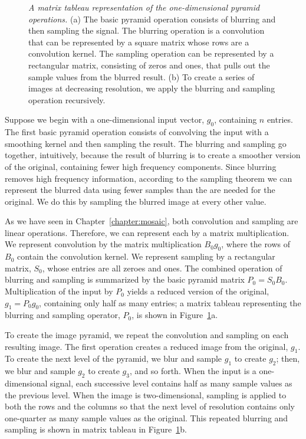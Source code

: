 \begin{figure}
\centerline{
}
\caption[Matrix tableau of one-dimensional pyramid]{
{\em A matrix tableau representation of the one-dimensional pyramid
operations. }  (a)  The basic pyramid operation consists of blurring
and then sampling the signal.  The blurring operation is a convolution
that can be represented by a square matrix whose rows are a
convolution kernel.  The sampling operation can be represented by a
rectangular matrix, consisting of zeros and ones, that pulls out the
sample values from the blurred result.  (b)  To create a series of
images at decreasing resolution, we apply the blurring and sampling
operation recursively.
}
\label{f7:pyramid1Tableau}
\end{figure}
Suppose we begin with a one-dimensional input vector, $g_0$,
containing $n$ entries.  The first basic pyramid operation consists of
convolving the input with a smoothing kernel and then sampling the
result.  The blurring and sampling go together, intuitively, because
the result of blurring is to create a smoother version of the
original, containing fewer high frequency components.  Since
blurring removes high frequency information, according to
the sampling theorem we can represent the blurred data using fewer
samples than the are needed for the original.  We do this by sampling
the blurred image at every other value.  

As we have seen in Chapter~\ref{chapter:mosaic}, both convolution
and sampling are linear operations.  Therefore, we can represent each
by a matrix multiplication.  We represent convolution by the matrix
multiplication $B_0 g_0$, where the rows of $B_0$ contain the
convolution kernel.  We represent sampling by a rectangular matrix,
$S_0$, whose entries are all zeroes and ones.  The combined operation
of blurring and sampling is summarized by the basic pyramid matrix
$P_0 = S_0 B_0$.  Multiplication of the input by $P_0$ yields a
reduced version of the original, $g_1 = P_0 g_0$, containing only half
as many entries; a matrix tableau representing the blurring and
sampling operator, $P_0$, is shown in Figure~\ref{f7:pyramid1Tableau}a.

To create the image pyramid, we repeat the convolution and sampling on
each resulting image.  The first operation creates a reduced image
from the original, $g_1$.  To create the next level of the pyramid, we
blur and sample $g_1$ to create $g_2$; then, we blur and sample $g_2$
to create $g_3$, and so forth.  When the input is a one-dimensional
signal, each successive level contains half as many sample values as
the previous level.  When the image is two-dimensional, sampling is
applied to both the rows and the columns so that the next level of
resolution contains only one-quarter as many sample values as the
original.  This repeated blurring and sampling is shown in matrix
tableau in Figure~\ref{f7:pyramid1Tableau}b.

